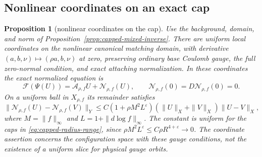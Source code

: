 \documentclass[11pt]{amsart}
\newtheorem{proposition}[theorem]{Proposition}
\theoremstyle{definition}
\theoremstyle{remark}
\theoremstyle{plain}
\begin{document}
\subsection{Nonlinear coordinates on an exact cap}
\begin{proposition}[nonlinear coordinates on the cap]
\label{prop:nonlinear-cap-chart}
Use the background, domain, and norm of
Proposition~\ref{prop:capped-mixed-inverse}. There are uniform
local coordinates on the nonlinear canonical matching domain,
with derivative $(a,b,\nu)\mapsto(\rho a,b,\nu)$ at zero,
preserving ordinary base Coulomb gauge, the full zero-normal
condition, and exact attaching normalization. In these
coordinates the exact normalized equation is
\[
 \mathcal F(\Psi(U))=\mathcal A_{\rho,f}U+\mathcal N_{\rho,f}(U),
 \qquad \mathcal N_{\rho,f}(0)=D\mathcal N_{\rho,f}(0)=0.
\]
On a uniform ball in $X_{\rho,f}$ its remainder satisfies
\begin{equation}\label{eq:nonlinear-cap-difference}
 \|\mathcal N_{\rho,f}(U)-\mathcal N_{\rho,f}(V)\|_Y
 \leq C(1+\rho M^2L^\varepsilon)
       (\|U\|_X+\|V\|_X)\|U-V\|_X,
\end{equation}
where $M=\|f\|_\infty$ and $L=1+\|d\log f\|_\infty$.
The constant is uniform for the caps in
\eqref{eq:capped-radius-range}, since
$\rho M^2L^\varepsilon\leq C\rho R^{4+\varepsilon}\to0$.
The coordinate assertion concerns the configuration space with
these gauge conditions, not the existence of a uniform slice
for physical gauge orbits.
\end{proposition}
\end{document}

